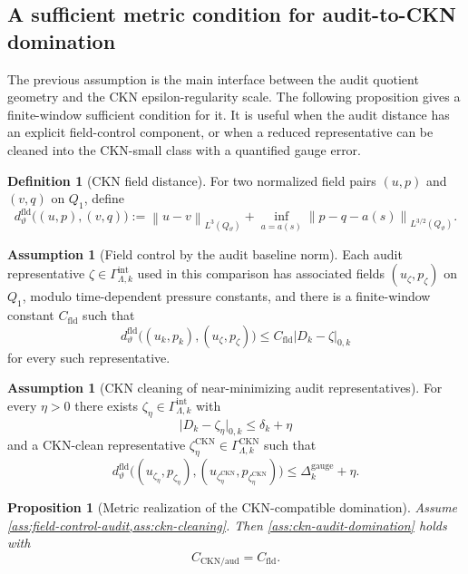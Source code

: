 \documentclass[11pt]{article}
\numberwithin{equation}{section}
\theoremstyle{plain}
\newtheorem{proposition}[theorem]{Proposition}
\theoremstyle{definition}
\newtheorem{definition}[theorem]{Definition}
\newtheorem{assumption}[theorem]{Assumption}
\theoremstyle{remark}
\newcommand{\intg}{\mathrm{int}}
\newcommand{\norm}[1]{\left\lVert #1\right\rVert}
\begin{document}
\subsection{A sufficient metric condition for audit-to-CKN domination}

The previous assumption is the main interface between the audit quotient
geometry and the CKN epsilon-regularity scale.  The following proposition gives
a finite-window sufficient condition for it.  It is useful when the audit
distance has an explicit field-control component, or when a reduced
representative can be cleaned into the CKN-small class with a quantified
gauge error.

\begin{definition}[CKN field distance]\label{def:ckn-field-distance}
For two normalized field pairs \((u,p)\) and \((v,q)\) on \(Q_1\), define
\[
  d_\vartheta^{\mathrm{fld}}\bigl((u,p),(v,q)\bigr)
  :=
  \norm{u-v}_{L^3(Q_\vartheta)}
  +
  \inf_{a=a(s)}
  \norm{p-q-a(s)}_{L^{3/2}(Q_\vartheta)}.
\]
\end{definition}

\begin{assumption}[Field control by the audit baseline norm]
\label{ass:field-control-audit}
Each audit representative \(\zeta\in\Gamma_{\Lambda,k}^{\intg}\) used in this
comparison has associated fields \((u_\zeta,p_\zeta)\) on \(Q_1\), modulo
time-dependent pressure constants, and there is a finite-window constant
\(C_{\mathrm{fld}}\) such that
\[
  d_\vartheta^{\mathrm{fld}}\bigl((u_k,p_k),(u_\zeta,p_\zeta)\bigr)
  \le
  C_{\mathrm{fld}}\lvert D_k-\zeta\rvert_{0,k}
\]
for every such representative.
\end{assumption}

\begin{assumption}[CKN cleaning of near-minimizing audit representatives]
\label{ass:ckn-cleaning}
For every \(\eta>0\) there exists
\(\zeta_\eta\in\Gamma_{\Lambda,k}^{\intg}\) with
\[
  \lvert D_k-\zeta_\eta\rvert_{0,k}\le\delta_k+\eta
\]
and a CKN-clean representative
\(\zeta_\eta^{\mathrm{CKN}}\in\Gamma_{\Lambda,k}^{\mathrm{CKN}}\) such that
\[
  d_\vartheta^{\mathrm{fld}}
  \bigl((u_{\zeta_\eta},p_{\zeta_\eta}),
  (u_{\zeta_\eta^{\mathrm{CKN}}},
  p_{\zeta_\eta^{\mathrm{CKN}}})\bigr)
  \le
  \Delta_k^{\mathrm{gauge}}+\eta.
\]
\end{assumption}

\begin{proposition}[Metric realization of the CKN-compatible domination]
\label{prop:metric-realizes-ckn-domination}
Assume \cref{ass:field-control-audit,ass:ckn-cleaning}.  Then
\cref{ass:ckn-audit-domination} holds with
\[
  C_{\mathrm{CKN/aud}}=C_{\mathrm{fld}}.
\]
\end{proposition}
\end{document}
